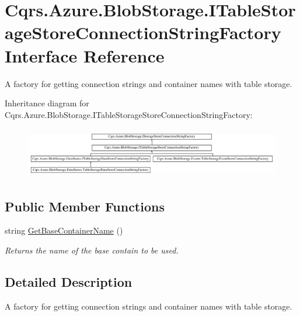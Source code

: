 \hypertarget{interfaceCqrs_1_1Azure_1_1BlobStorage_1_1ITableStorageStoreConnectionStringFactory}{}\section{Cqrs.\+Azure.\+Blob\+Storage.\+I\+Table\+Storage\+Store\+Connection\+String\+Factory Interface Reference}
\label{interfaceCqrs_1_1Azure_1_1BlobStorage_1_1ITableStorageStoreConnectionStringFactory}


A factory for getting connection strings and container names with table storage.  


Inheritance diagram for Cqrs.\+Azure.\+Blob\+Storage.\+I\+Table\+Storage\+Store\+Connection\+String\+Factory\+:\begin{figure}[H]
\begin{center}
\leavevmode
\includegraphics[height=2.231076cm]{interfaceCqrs_1_1Azure_1_1BlobStorage_1_1ITableStorageStoreConnectionStringFactory}
\end{center}
\end{figure}
\subsection*{Public Member Functions}
\begin{DoxyCompactItemize}
\item 
string \hyperlink{interfaceCqrs_1_1Azure_1_1BlobStorage_1_1ITableStorageStoreConnectionStringFactory_a1b9bfc9dcb7292e62619fc46e4a85982_a1b9bfc9dcb7292e62619fc46e4a85982}{Get\+Base\+Container\+Name} ()
\begin{DoxyCompactList}\small\item\em Returns the name of the base contain to be used. \end{DoxyCompactList}\end{DoxyCompactItemize}


\subsection{Detailed Description}
A factory for getting connection strings and container names with table storage. 



